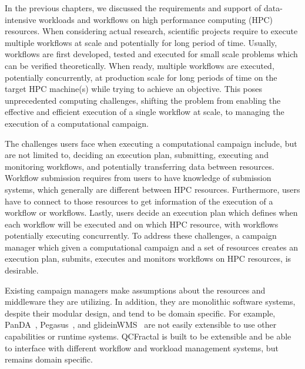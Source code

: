 \label{ch:cmanager}

In the previous chapters, we discussed the requirements and support of data-intensive workloads and workflows on high performance computing (HPC) resources. 
When considering actual research, scientific projects require to execute multiple workflows at scale and potentially for long period of time.
Usually, workflows are first developed, tested and executed for small scale problems which can be verified theoretically.
When ready, multiple workflows are executed, potentially concurrently, at production scale for long periods of time on the target HPC machine(s) while trying to achieve an objective.
This poses unprecedented computing challenges, shifting the problem from enabling the effective and efficient execution of a single workflow at scale, to managing the execution of a computational campaign.

The challenges users face when executing a computational campaign include, but are not limited to, deciding an execution plan, submitting, executing and monitoring workflows, and potentially transferring data between resources.
Workflow submission requires from users to have knowledge of submission systems, which generally are different between HPC resources.
Furthermore, users have to connect to those resources to get information of the execution of a workflow or workflows.
Lastly, users decide an execution plan which defines when each workflow will be executed and on which HPC resource, with workflows potentially executing concurrently.
To address these challenges, a campaign manager which given a computational campaign and a set of resources creates an execution plan, submits, executes and monitors workflows on HPC resources, is desirable.

Existing campaign managers make assumptions about the resources and middleware they are utilizing.
In addition, they are monolithic software systems, despite their modular design, and tend to be domain specific.
For example, PanDA~\cite{maeno2008panda}, Pegasus~\cite{deelman2015pegasus}, and glideinWMS~\cite{sfiligoi2008glidein} are not easily extensible to use other capabilities or runtime systems.
QCFractal is built to be extensible and be able to interface with different workflow and workload management systems, but remains domain specific.

